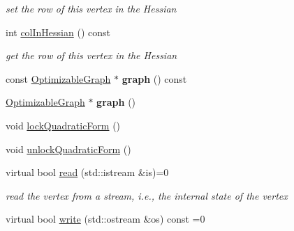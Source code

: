 \begin{DoxyCompactItemize}
\begin{DoxyCompactList}\small\item\em set the row of this vertex in the Hessian \end{DoxyCompactList}\item 
\hypertarget{classg2o_1_1OptimizableGraph_1_1Vertex_a9559c391b2962de131045a90815a9b5a}{int \hyperlink{classg2o_1_1OptimizableGraph_1_1Vertex_a9559c391b2962de131045a90815a9b5a}{col\-In\-Hessian} () const }\label{classg2o_1_1OptimizableGraph_1_1Vertex_a9559c391b2962de131045a90815a9b5a}

\begin{DoxyCompactList}\small\item\em get the row of this vertex in the Hessian \end{DoxyCompactList}\item 
\hypertarget{classg2o_1_1OptimizableGraph_1_1Vertex_a6dd9a3f7fd07016cdbe791e21c6d87df}{const \hyperlink{structg2o_1_1OptimizableGraph}{Optimizable\-Graph} $\ast$ {\bfseries graph} () const }\label{classg2o_1_1OptimizableGraph_1_1Vertex_a6dd9a3f7fd07016cdbe791e21c6d87df}

\item 
\hypertarget{classg2o_1_1OptimizableGraph_1_1Vertex_a3f845c6f0ba9a87ab15caaddba5a4037}{\hyperlink{structg2o_1_1OptimizableGraph}{Optimizable\-Graph} $\ast$ {\bfseries graph} ()}\label{classg2o_1_1OptimizableGraph_1_1Vertex_a3f845c6f0ba9a87ab15caaddba5a4037}

\item 
void \hyperlink{classg2o_1_1OptimizableGraph_1_1Vertex_a2eb3dbe08fd20ca8feeeaecc63ce240c}{lock\-Quadratic\-Form} ()
\item 
void \hyperlink{classg2o_1_1OptimizableGraph_1_1Vertex_a5badd602625433ee1ce8e2aa7bb3b2ac}{unlock\-Quadratic\-Form} ()
\item 
\hypertarget{classg2o_1_1OptimizableGraph_1_1Vertex_a356c40d33c3f1e07afa938dfb4870230}{virtual bool \hyperlink{classg2o_1_1OptimizableGraph_1_1Vertex_a356c40d33c3f1e07afa938dfb4870230}{read} (std\-::istream \&is)=0}\label{classg2o_1_1OptimizableGraph_1_1Vertex_a356c40d33c3f1e07afa938dfb4870230}

\begin{DoxyCompactList}\small\item\em read the vertex from a stream, i.\-e., the internal state of the vertex \end{DoxyCompactList}\item 
\hypertarget{classg2o_1_1OptimizableGraph_1_1Vertex_a4cac277db656fddb5f844d9009d601eb}{virtual bool \hyperlink{classg2o_1_1OptimizableGraph_1_1Vertex_a4cac277db656fddb5f844d9009d601eb}{write} (std\-::ostream \&os) const =0}\label{classg2o_1_1OptimizableGraph_1_1Vertex_a4cac277db656fddb5f844d9009d601eb}


\end{DoxyCompactItemize}
